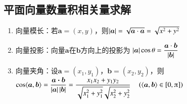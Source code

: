   \subsection{平面向量数量积相关量求解}
    \begin{enumerate}[label=\arabic*)]
      \item 向量模长：若$\bm a=(x,y)$，则$\left| \bm a \right|=\sqrt{\bm a\cdot\bm a}=\sqrt{x^2+y^2}$
      \item 向量投影：向量$\bm a$在$\bm b$方向上的投影为
        $\left| \bm{a} \right|\cos\theta=\dfrac{\bm a\cdot\bm b}{\left| \bm b \right|}$
      \item 向量夹角：设$\bm a=(x_1,y_1)$，$\bm b=(x_2,y_2)$，则
        $\cos\vangle{\bm a}{\bm b}=\dfrac{\bm{a}\bm{\cdot}\bm{b}}{\abs{\bm{a}}\abs{\bm{b}}}=\dfrac{x_1x_2+y_1y_2}{\sqrt{x_1^2+y_1^2}\sqrt{x_2^2+y_2^2}} \quad \left(\vangle{\bm a}{\bm b}\in\left[0,\piup\right]\right)$
    \end{enumerate}
